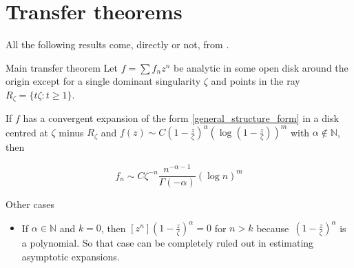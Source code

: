 \documentclass[../main.tex]{subfiles}
\begin{document}
\section{Transfer theorems}

All the following results come, directly or not, from \cite{Flajolet1990}.

\begin{thm}{Main transfer theorem}
	Let $f = \sum f_n z^n$ be analytic in some open disk around the origin except for a single dominant singularity $\zeta$ and points in the ray	$R_\zeta = \{t \zeta : t \geq 1 \}$.
	
	If $f$ has a convergent expansion of the form \eqref{general_structure_form} in a disk centred at $\zeta$ minus $R_\zeta$ and $f(z) \sim C {\left( 1 - \frac{z}{\zeta} \right)}^\alpha {\left(\log \left( 1 - \frac{z}{\zeta} \right)\right)}^m$ with $\alpha \not\in \mathbb{N}$,	
	then
	
	$$f_n \sim C {\zeta}^{-n} \frac{n^{-\alpha - 1}}{\Gamma(-\alpha)} {(\log n)}^m$$
\end{thm}

%	
%	
%	


\begin{thm}{Other cases}
	\begin{itemize}{}{}
		~
		
		\item If $\alpha \in \mathbb{N}$ and $k = 0$, then $[z^n]{\left(1 - \frac{z}{\zeta}\right)}^\alpha = 0$ for $n > k$
		because~${\left(1 - \frac{z}{\zeta}\right)}^\alpha$ is a polynomial. So that case can be completely ruled out in estimating asymptotic expansions.
		
	\end{itemize}
	
%	
%	
%	
%	
\end{thm}
\end{document}
